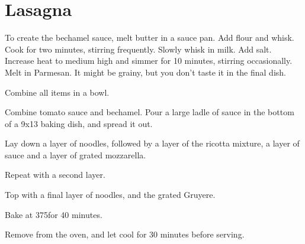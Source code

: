 
\section{Lasagna}
\begin{recipe}


To create the bechamel sauce, melt butter in a sauce pan. Add flour and whisk. Cook for two minutes, stirring frequently. Slowly whisk in milk. Add salt. Increase heat to medium high and simmer for 10 minutes, stirring occasionally. Melt in Parmesan. It might be grainy, but you don't taste it in the final dish.


Combine all items in a bowl.


Combine tomato sauce and bechamel. Pour a large ladle of sauce in the bottom of a 9x13 baking dish, and spread it out.

Lay down a layer of noodles, followed by a layer of the ricotta mixture, a layer of sauce and a layer of grated mozzarella.

Repeat with a second layer.


Top with a final layer of noodles, and the grated Gruyere.

Bake at 375\degree for 40 minutes.

Remove from the oven, and let cool for 30 minutes before serving.


\end{recipe}

